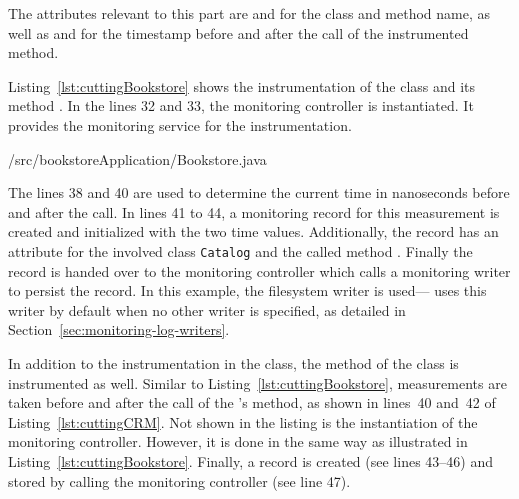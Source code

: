 \noindent The attributes relevant to this part are  and  %
for the class and method name, as well as  and  for %
the timestamp before and after the call of the instrumented method. 

\enlargethispage{0.7cm}

Listing~\ref{lst:cuttingBookstore} shows the instrumentation of the  class and its method . In the lines 32 and 33, the monitoring controller is instantiated. It provides the monitoring service for the instrumentation.


\setJavaCodeListing
%
{\manualInstrumentedBookstoreApplicationDir/src/bookstoreApplication/Bookstore.java}
 
\noindent The lines 38 and 40 are used to determine the current time in nanoseconds before and after the  call. In lines 41 to 44, a monitoring record for this measurement is created and initialized with the two time values. Additionally, the record has an attribute for the involved class \verb!Catalog! and the called method . Finally the record is handed over to the monitoring controller which calls a monitoring writer to persist the record. %
In this example, the filesystem writer is used---\Kieker{} uses this writer by default when no other writer is specified, %
as detailed in Section~\ref{sec:monitoring-log-writers}. %

In addition to the instrumentation in the  class, the  method of the  class is instrumented as well. Similar to Listing~\ref{lst:cuttingBookstore}, measurements are taken before and after the call of the 's  method, as shown in %
lines~40 and~42 of Listing~\ref{lst:cuttingCRM}. Not shown in the listing is the instantiation of the monitoring controller. However, it is done in the same way as illustrated in Listing~\ref{lst:cuttingBookstore}. %
Finally, a record is created (see lines 43--46) and stored by calling the monitoring controller (see line 47).

